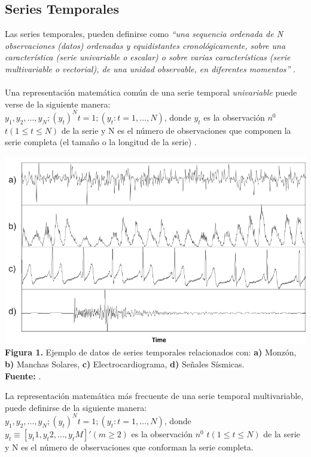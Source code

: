 \subsection{Series Temporales}
Las series temporales, pueden definirse como \textit{\enquote{una sequencia ordenada de N observaciones (datos) ordenadas y equidistantes cronol\'ogicamente, sobre una caracter\'istica (serie univariable o escalar) o sobre varias caracter\'isticas (serie multivariable o vectorial), de una unidad observable, en diferentes momentos}} \cite{tak-chung}.\\\\
Una representaci\'on matem\'atica com\'un de una serie temporal \textit{univariable} puede verse de la siguiente manera:\\
$y_1, y_2,...,y_N; (y_t)^N t=1; (y_t:t=1,...,N)$, donde $y_t$ es la observaci\'on $n^0$ $t(1 \leq t \leq N)$ de la serie y N es el n\'umero de observaciones que componen la serie completa (el tama\~no o la longitud de la serie) \cite{concepts}.
\begin{center}
\includegraphics[scale=0.7]{timeSeries.png}\\
\vspace*{10pt}
\footnotesize{\textbf{Figura 1.} Ejemplo de datos de series temporales relacionados con: \textbf{a)} Monz\'on, \textbf{b)} Manchas Solares, \textbf{c)} Electrocardiograma, \textbf{d)} Se\~nales S\'ismicas.}\\ \textbf{Fuente:} \cite{concepts}.
\end{center}
La representaci\'on matem\'atica m\'as frecuente de una serie temporal multivariable, puede definirse de la siguiente manera:\\
$y_1, y_2,...,y_N; (y_t)^N t=1; (y_t: t=1,...,N)$, donde $y_t \equiv [y_t1, y_t2,...,y_tM]' (m \geq 2)$ es la observaci\'on $n^0$ $t(1 \leq t \leq N)$ de la serie y N es el n\'umero de observaciones que conforman la serie completa.\\
